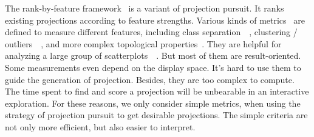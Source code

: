 The rank-by-feature framework~\cite{DBLP:journals/ivs/SeoS05} is a variant of projection pursuit. It ranks existing projections according to feature strengths. Various kinds of metrics~\cite{DBLP:conf/ieeevast/AlbuquerqueEM11} are defined to measure different features, including class separation~\cite{DBLP:journals/cgf/SipsNLH09}~\cite{DBLP:journals/cgf/SedlmairTMT12}, clustering / outliers~\cite{DBLP:conf/ieeevast/TatuAESTMK09}~\cite{DBLP:journals/tvcg/JohanssonJ09}, and more complex topological properties~\cite{DBLP:conf/infovis/WilkinsonAG05}. They are helpful for analyzing a large group of scatterplots~\cite{DBLP:conf/apvis/NhonW14}~\cite{DBLP:conf/ieeevast/AnandWN12}. But most of them are result-oriented. Some measurements even depend on the display space. It's hard to use them to guide the generation of projection. Besides, they are too complex to compute. The time spent to find and score a projection will be unbearable in an interactive exploration. For these reasons, we only consider simple metrics, when using the strategy of projection pursuit to get desirable projections. The simple criteria are not only more efficient, but also easier to interpret.
